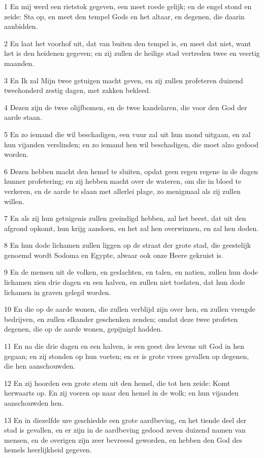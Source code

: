 \par 1 En mij werd een rietstok gegeven, een meet roede gelijk; en de engel stond en zeide: Sta op, en meet den tempel Gods en het altaar, en degenen, die daarin aanbidden.
\par 2 En laat het voorhof uit, dat van buiten den tempel is, en meet dat niet, want het is den heidenen gegeven; en zij zullen de heilige stad vertreden twee en veertig maanden.
\par 3 En Ik zal Mijn twee getuigen macht geven, en zij zullen profeteren duizend tweehonderd zestig dagen, met zakken bekleed.
\par 4 Dezen zijn de twee olijfbomen, en de twee kandelaren, die voor den God der aarde staan.
\par 5 En zo iemand die wil beschadigen, een vuur zal uit hun mond uitgaan, en zal hun vijanden verslinden; en zo iemand hen wil beschadigen, die moet alzo gedood worden.
\par 6 Dezen hebben macht den hemel te sluiten, opdat geen regen regene in de dagen hunner profetering; en zij hebben macht over de wateren, om die in bloed te verkeren, en de aarde te slaan met allerlei plage, zo menigmaal als zij zullen willen.
\par 7 En als zij hun getuigenis zullen geeindigd hebben, zal het beest, dat uit den afgrond opkomt, hun krijg aandoen, en het zal hen overwinnen, en zal hen doden.
\par 8 En hun dode lichamen zullen liggen op de straat der grote stad, die geestelijk genoemd wordt Sodoma en Egypte, alwaar ook onze Heere gekruist is.
\par 9 En de mensen uit de volken, en geslachten, en talen, en natien, zullen hun dode lichamen zien drie dagen en een halven, en zullen niet toelaten, dat hun dode lichamen in graven gelegd worden.
\par 10 En die op de aarde wonen, die zullen verblijd zijn over hen, en zullen vreugde bedrijven, en zullen elkander geschenken zenden; omdat deze twee profeten degenen, die op de aarde wonen, gepijnigd hadden.
\par 11 En na die drie dagen en een halven, is een geest des levens uit God in hen gegaan; en zij stonden op hun voeten; en er is grote vrees gevallen op degenen, die hen aanschouwden.
\par 12 En zij hoorden een grote stem uit den hemel, die tot hen zeide: Komt herwaarts op. En zij voeren op naar den hemel in de wolk; en hun vijanden aanschouwden hen.
\par 13 En in diezelfde ure geschiedde een grote aardbeving, en het tiende deel der stad is gevallen, en er zijn in de aardbeving gedood zeven duizend namen van mensen, en de overigen zijn zeer bevreesd geworden, en hebben den God des hemels heerlijkheid gegeven.
